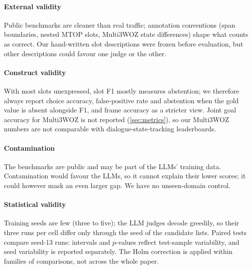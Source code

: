 \paragraph{External validity} Public benchmarks are cleaner than real traffic; annotation conventions (span boundaries, nested MTOP slots, Multi3WOZ state differences) shape what counts as correct. Our hand-written slot descriptions were frozen before evaluation, but other descriptions could favour one judge or the other.

\paragraph{Construct validity} With most slots unexpressed, slot F1 mostly measures abstention; we therefore always report choice accuracy, false-positive rate and abstention when the gold value is absent alongside F1, and frame accuracy as a stricter view. Joint goal accuracy for Multi3WOZ is not reported (\cref{sec:metrics}), so our Multi3WOZ numbers are not comparable with dialogue-state-tracking leaderboards.

\paragraph{Contamination} The benchmarks are public and may be part of the LLMs' training data. Contamination would favour the LLMs, so it cannot explain their lower scores; it could however mask an even larger gap. We have no unseen-domain control.

\paragraph{Statistical validity} Training seeds are few (three to five); the LLM judges decode greedily, so their three runs per cell differ only through the seed of the candidate lists. Paired tests compare seed-13 runs: intervals and $p$-values reflect test-sample variability, and seed variability is reported separately. The Holm correction is applied within families of comparisons, not across the whole paper.
